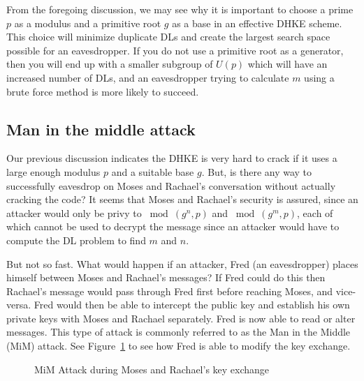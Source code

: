 From the foregoing discussion, we may see why it is important to choose a prime $p$ as a modulus and a primitive root $g$ as a base in an effective DHKE scheme. This choice will minimize duplicate DLs and create the largest search space possible for an eavesdropper.  If you do not use a primitive root as a generator, then you will end up with a smaller subgroup of $U(p)$ which will have an increased number of DLs, and an eavesdropper trying to calculate $m$ using a brute force method is more likely to succeed. 

\subsection{Man in the middle attack}
Our previous discussion indicates the DHKE is very hard to crack if it uses a large enough modulus $p$ and a suitable base $g$. But, is there any way to successfully eavesdrop on Moses and Rachael's conversation without actually cracking the code?  It seems that Moses and Rachael's security is assured, since an attacker would only be privy to $\bmod (g^n , p)$ and $\bmod (g^m , p)$, each of which cannot be used to decrypt the message since an attacker would have to compute the DL problem to find $m$ and $n$. 

But not so fast. What would happen if an attacker, Fred (an eavesdropper) places himself between Moses and Rachael's messages?  If Fred could do this then Rachael's message would pass through Fred first before reaching Moses, and vice-versa.  Fred would then be able to intercept the public key and establish his own private keys with Moses and Rachael separately.  Fred is now able to read or alter messages.  This type of attack is commonly referred to as the Man in the Middle (MiM) attack.  See Figure~\ref{fig:DH:DHKE_2} to see how Fred is able to modify the key exchange.
\begin{figure}[htbp]
	  \caption{\label{fig:DH:DHKE_2} MiM Attack during Moses and Rachael's key exchange }
\end{figure}


